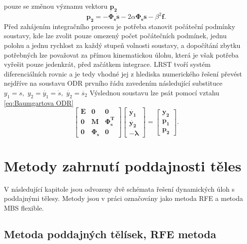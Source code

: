 pouze se změnou významu vektoru $ \mathbf{p_2} $ \cite{cite:stabilzace_articl,cite:bible}
\begin{equation}\label{eq:Baumgartovo p_2}
	\mathbf{p_2} = - \mathbf{\dot{\Phi_s}}\mathbf{\dot{s}} - 2\alpha \mathbf{\Phi_s} \mathbf{s} - \beta^2\mathbf{f}.
\end{equation}
Před zahájením integračního procesu je potřeba stanovit počáteční podmínky soustavy, kde lze zvolit pouze omezený počet počátečních podmínek, jednu polohu a jednu rychlost za každý stupeň volnosti soustavy, a dopočítání zbytku potřebných lze považovat za přímou kinematickou úlohu, která je však potřeba vyřešit pouze jedenkrát, před začátkem integrace. LRST tvoří systém diferenciálních rovnic a je tedy vhodné jej z hlediska numerického řešení převést nejdříve na soustavu ODR prvního řádu zavedením následující substituce
$ y_1 = s, \,\, y_2 = \dot{y_1} = \dot{s}, \,\, \dot{y_2} = \ddot{s_2} $
Výslednou soustavu lze psát pomocí vztahu \ref{eq:Baumgartova ODR} \cite{cite:bible}
\begin{equation} \label{eq:Baumgartova ODR}
	\begin{bmatrix}
		\mathbf{E} & \mathbf{0} & \mathbf{0}\\
		\mathbf{0} & \mathbf{M} & \mathbf{\Phi_s^T} \\
		\mathbf{0} & \mathbf{\Phi_s} & \mathbf{0}
	\end{bmatrix}
	\begin{bmatrix}
		\mathbf{\dot{y_1}}\\
		\mathbf{\dot{y_2}}\\
		-\mathbf{\lambda}
	\end{bmatrix}
	=
	\begin{bmatrix}
		\mathbf{y_2}\\
		\mathbf{p_1}\\
		\mathbf{p_2}
	\end{bmatrix}.
\end{equation}

\chapter{Metody zahrnutí poddajnosti těles}

V následující kapitole jsou odvozeny dvě schémata řešení dynamických úloh s poddajnými tělesy. Metody jsou v práci označovány jako metoda RFE a metoda MBS flexible.

\section{Metoda poddajných tělísek, RFE metoda} \label{sec:RFE}


